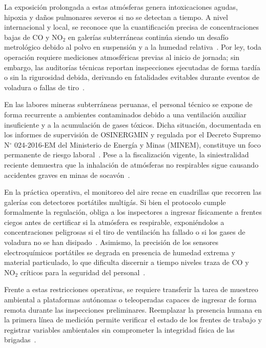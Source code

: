 La exposición prolongada a estas atmósferas genera intoxicaciones agudas, hipoxia y daños pulmonares severos si no se detectan a tiempo. A nivel internacional y local, se reconoce que la cuantificación precisa de concentraciones bajas de $\text{CO}$ y $\text{NO}_2$ en galerías subterráneas continúa siendo un desafío metrológico debido al polvo en suspensión y a la humedad relativa~\cite{EU_ExposureDirective_2020}. Por ley, toda operación requiere mediciones atmosféricas previas al inicio de jornada; sin embargo, las auditorías técnicas reportan inspecciones ejecutadas de forma tardía o sin la rigurosidad debida, derivando en fatalidades evitables durante eventos de voladura o fallas de tiro~\cite{MINEM_Yanaquihua_2023, OSINERGMIN_BoletinGSM_2020, MINEM_DS024_2016}.



En las labores mineras subterráneas peruanas, el personal técnico se expone de forma recurrente a ambientes contaminados debido a una ventilación auxiliar insuficiente y a la acumulación de gases tóxicos. Dicha situación, documentada en los informes de supervisión de OSINERGMIN y regulada por el Decreto Supremo N$^\circ$ 024-2016-EM del Ministerio de Energía y Minas (MINEM), constituye un foco permanente de riesgo laboral~\cite{OSINERGMIN_BoletinGSM_2020, MINEM_DS024_2016}. Pese a la fiscalización vigente, la siniestralidad reciente demuestra que la inhalación de atmósferas no respirables sigue causando accidentes graves en minas de socavón~\cite{MINEM_Yanaquihua_2023}.

En la práctica operativa, el monitoreo del aire recae en cuadrillas que recorren las galerías con detectores portátiles multigás. Si bien el protocolo cumple formalmente la regulación, obliga a los inspectores a ingresar físicamente a frentes ciegos antes de certificar si la atmósfera es respirable, exponiéndolos a concentraciones peligrosas si el tiro de ventilación ha fallado o si los gases de voladura no se han disipado~\cite{MINEM_DS024_2016, OSINERGMIN_BoletinGSM_2020}. Asimismo, la precisión de los sensores electroquímicos portátiles se degrada en presencia de humedad extrema y material particulado, lo que dificulta discernir a tiempo niveles traza de $\text{CO}$ y $\text{NO}_2$ críticos para la seguridad del personal~\cite{EU_ExposureDirective_2020}.

Frente a estas restricciones operativas, se requiere transferir la tarea de muestreo ambiental a plataformas autónomas o teleoperadas capaces de ingresar de forma remota durante las inspecciones preliminares. Reemplazar la presencia humana en la primera línea de medición permite verificar el estado de los frentes de trabajo y registrar variables ambientales sin comprometer la integridad física de las brigadas~\cite{OSINERGMIN_BoletinGSM_2020, MINEM_DS024_2016}.

